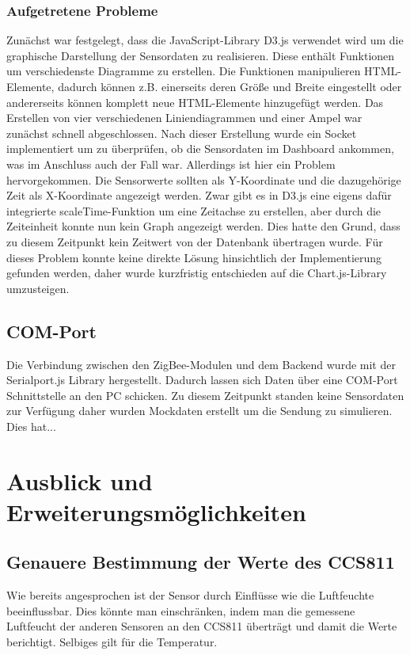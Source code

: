 \documentclass[]{article}
\begin{document}
			\subsubsection{Aufgetretene Probleme}
			Zunächst war festgelegt, dass die JavaScript-Library D3.js verwendet wird um die graphische Darstellung der Sensordaten zu realisieren. Diese enthält Funktionen um verschiedenste Diagramme zu erstellen. Die Funktionen manipulieren HTML-Elemente, dadurch können z.B. einerseits deren Größe und Breite eingestellt oder andererseits können komplett neue HTML-Elemente hinzugefügt werden. Das Erstellen von vier verschiedenen Liniendiagrammen und einer Ampel war zunächst schnell abgeschlossen. Nach dieser Erstellung wurde ein Socket implementiert um zu überprüfen, ob die Sensordaten im Dashboard ankommen, was im Anschluss auch der Fall war. Allerdings ist hier ein Problem hervorgekommen.\newline
			Die Sensorwerte sollten als Y-Koordinate und die dazugehörige Zeit als X-Koordinate angezeigt werden. Zwar gibt es in D3.js eine eigens dafür integrierte scaleTime-Funktion um eine Zeitachse zu erstellen, aber durch die Zeiteinheit konnte nun kein Graph angezeigt werden. Dies hatte den Grund, dass zu diesem Zeitpunkt kein Zeitwert von der Datenbank übertragen wurde. Für dieses Problem konnte keine direkte Lösung hinsichtlich der Implementierung gefunden werden, daher wurde kurzfristig entschieden auf die Chart.js-Library umzusteigen.\newline 
			
			
			\subsection{COM-Port}
			Die Verbindung zwischen den ZigBee-Modulen und dem Backend wurde mit der Serialport.js Library hergestellt. Dadurch lassen sich Daten über eine COM-Port Schnittstelle an den PC schicken. Zu diesem Zeitpunkt standen keine Sensordaten zur Verfügung daher wurden Mockdaten erstellt um die Sendung zu simulieren. Dies hat...
			
	\section{Ausblick und Erweiterungsmöglichkeiten}
		\subsection{Genauere Bestimmung der Werte des CCS811}
			Wie bereits angesprochen ist der Sensor durch Einflüsse wie die Luftfeuchte beeinflussbar. Dies könnte man einschränken, indem man die gemessene Luftfeucht  der anderen Sensoren an den CCS811 überträgt und damit die Werte berichtigt. Selbiges gilt für die Temperatur. 
		
		

\printbibliography
\end{document}
